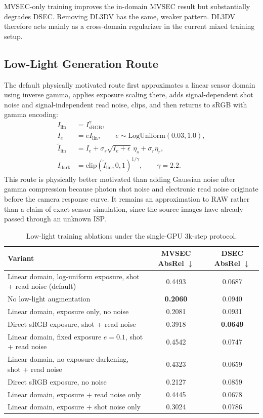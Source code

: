 \documentclass[10pt]{article}
\newcommand{\best}[1]{\textbf{#1}}
\newcommand{\down}{\ensuremath{\downarrow}}
\begin{document}
MVSEC-only training improves the in-domain MVSEC result but substantially
degrades DSEC.  Removing DL3DV has the same, weaker pattern.  DL3DV therefore
acts mainly as a cross-domain regularizer in the current mixed training setup.

\subsection{Low-Light Generation Route}

The default physically motivated route first approximates a linear sensor
domain using inverse gamma, applies exposure scaling there, adds
signal-dependent shot noise and signal-independent read noise, clips, and then
returns to sRGB with gamma encoding:
\begin{align}
 I_{\mathrm{lin}} &= I_{\mathrm{sRGB}}^{\gamma}, \\
 I_e &= e I_{\mathrm{lin}},\qquad
 e\sim\mathrm{LogUniform}(0.03,1.0), \\
 \widetilde I_{\mathrm{lin}} &= I_e
 + \sigma_s\sqrt{I_e+\epsilon}\,\eta_s
 + \sigma_r\eta_r, \\
 I_{\mathrm{dark}} &=
 \mathrm{clip}(\widetilde I_{\mathrm{lin}},0,1)^{1/\gamma},
 \qquad \gamma=2.2.
\end{align}
This route is physically better motivated than adding Gaussian noise after
gamma compression because photon shot noise and electronic read noise originate
before the camera response curve.  It remains an approximation to RAW rather
than a claim of exact sensor simulation, since the source images have already
passed through an unknown ISP.

\begin{table}[h]
\centering
\caption{Low-light training ablations under the single-GPU 3k-step protocol.}
\label{tab:lowlight}
\begin{tabular}{p{7.7cm}cc}
\toprule
Variant & MVSEC AbsRel \down & DSEC AbsRel \down \\
\midrule
Linear domain, log-uniform exposure, shot + read noise (default) & 0.4493 & 0.0687 \\
No low-light augmentation & \best{0.2060} & 0.0940 \\
Linear domain, exposure only, no noise & 0.2081 & 0.0931 \\
Direct sRGB exposure, shot + read noise & 0.3918 & \best{0.0649} \\
Linear domain, fixed exposure $e=0.1$, shot + read noise & 0.4542 & 0.0747 \\
Linear domain, no exposure darkening, shot + read noise & 0.4323 & 0.0659 \\
Direct sRGB exposure, no noise & 0.2127 & 0.0859 \\
Linear domain, exposure + read noise only & 0.4445 & 0.0678 \\
Linear domain, exposure + shot noise only & 0.3024 & 0.0786 \\
\bottomrule
\end{tabular}
\end{table}
\end{document}
